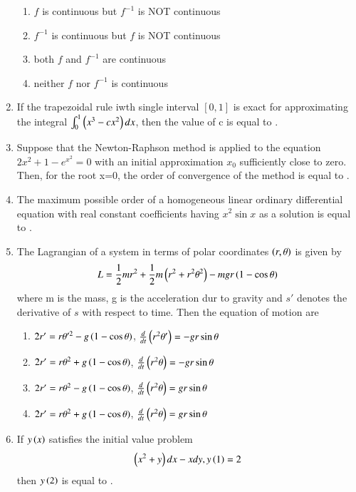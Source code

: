 \documentclass[journal]{IEEEtran}
\begin{document}
\begin{enumerate}
\begin{enumerate}
    \item $f$ is continuous but $f^{-1}$ is NOT continuous
    \item $f^{-1}$ is continuous but $f$ is NOT continuous
    \item both $f$ and $f^{-1}$ are continuous 
    \item neither $f$ nor $f^{-1}$ is continuous
\end{enumerate}
\vspace{0.5cm}
\item If the trapezoidal rule iwth single interval $[0,1]$ is exact for approximating the integral $\int_0^{1}\left(x^3-cx^2\right)dx$, then the value of c is equal to \underline{\hspace{2cm}}.
\vspace{0.5cm}
\item Suppose that the Newton-Raphson method is applied to the equation $2x^2+1-e^{x^2}=0$ with an initial approximation $x_0$ sufficiently close to zero. Then, for the root x=0, the order of convergence of the method is equal to \underline{\hspace{2cm}}.

\vspace{0.5cm}
\item The maximum possible order of a homogeneous linear ordinary differential equation with real constant coefficients having $x^2\sin{x}$ as a solution is equal to \underline{\hspace{2cm}}.

\vspace{0.5cm}
\item The Lagrangian of a system in terms of polar coordinates $\left(r,\theta\right)$ is given by
\begin{align*}
   L=\frac{1}{2}mr^2+\frac{1}{2}m\left(r^2+r^2\theta^2\right)-mgr\left(1-\cos{\theta}\right)
\end{align*}
where m is the mass, g is the acceleration dur to gravity and $s'$ denotes the derivative of $s$ with respect to time. Then the equation of motion are
\begin{enumerate}
    \item $2r'=r\theta'^2-g\left(1-\cos{\theta}\right)$, $\frac{d}{dt}\left(r^2\theta'\right)=-gr\sin{\theta}$
    \item  $2r'=r\theta^2+g\left(1-\cos{\theta}\right)$, $\frac{d}{dt}\left(r^2\theta\right)=-gr\sin{\theta}$
    \item  $2r'=r\theta^2-g\left(1-\cos{\theta}\right)$, $\frac{d}{dt}\left(r^2\theta\right)=gr\sin{\theta}$
    \item  $2r'=r\theta^2+g\left(1-\cos{\theta}\right)$, $\frac{d}{dt}\left(r^2\theta\right)=gr\sin{\theta}$
\end{enumerate}
\vspace{0.5cm}
\item If $y\left(x\right)$ satisfies the initial value problem 
\begin{align*}
    \left(x^2+y\right)dx-xdy, y\left(1\right)=2
\end{align*}
then $y\left(2\right)$ is equal to \underline{\hspace{2cm}}.
\vspace{0.5cm}


\end{enumerate}
\end{document}
